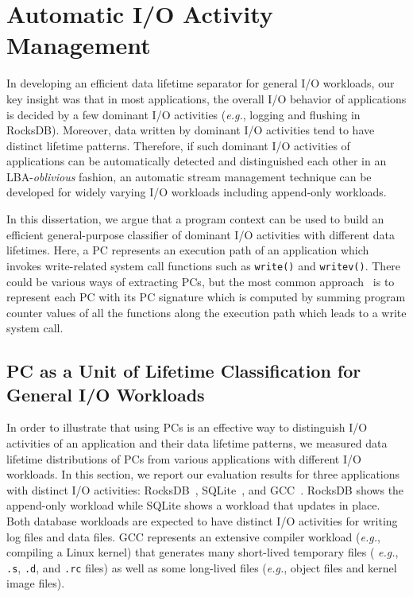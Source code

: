\section{Automatic I/O Activity Management}
\label{sec:programcontext}
In developing an efficient data lifetime separator for general I/O workloads,
our key insight was that in most applications, the overall I/O behavior of
applications is decided by a few dominant I/O activities ({\it e.g.}, logging and
flushing in RocksDB).  Moreover, data written by dominant I/O activities tend
to have distinct lifetime patterns.  Therefore, if such dominant I/O activities
of applications can be automatically detected and distinguished each other in
an LBA-{\it oblivious} fashion, an automatic stream management technique can be
developed for widely varying I/O workloads including append-only workloads.

In this dissertation, we argue that a program context can be used to build an
efficient general-purpose classifier of dominant I/O activities with different
data lifetimes.  Here, a PC represents an execution path of an application
which invokes write-related system call functions such as {\tt write()} and
{\tt writev()}.  There could be various ways of extracting PCs, but the most
common approach~\cite{PC, PC2} is to represent each PC with its PC signature
which is computed by summing program counter values of all the functions along
the execution path which leads to a write system call.


\subsection{PC as a Unit of Lifetime Classification for General I/O Workloads}
In order to illustrate that using PCs is an effective way to distinguish I/O
activities of an application and their data lifetime patterns, we measured data
lifetime distributions of PCs from various applications with different I/O
workloads.  In this section, we report our evaluation results for three
applications with distinct I/O activities: RocksDB~\cite{RocksDB},
SQLite~\cite{SQLite}, and GCC~\cite{GCC}.  RocksDB shows the append-only
workload while SQLite shows a workload that updates in place.  Both database
workloads are expected to have distinct I/O activities for writing log files
and data files.  GCC represents an extensive compiler workload ({\it e.g.},
compiling a Linux kernel) that generates many short-lived temporary files ({\it
e.g.}, \texttt{.s}, \texttt{.d}, and \texttt{.rc} files) as well as some
long-lived files ({\it e.g.}, object files and kernel image files).

